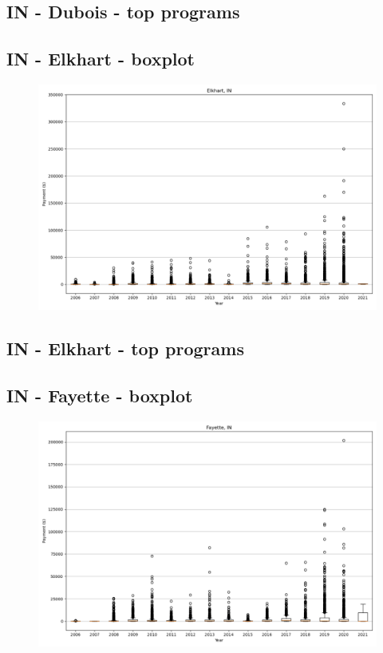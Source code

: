 \subsection*{IN - Dubois - top programs}

\newpage
\subsection*{IN - Elkhart - boxplot}
\begin{figure}[h]
\centering
\includegraphics[width=7in]{../output/boxplots/counties/Elkhart-IN_boxplot.png}
\end{figure}


\subsection*{IN - Elkhart - top programs}

\newpage
\subsection*{IN - Fayette - boxplot}
\begin{figure}[h]
\centering
\includegraphics[width=7in]{../output/boxplots/counties/Fayette-IN_boxplot.png}
\end{figure}


